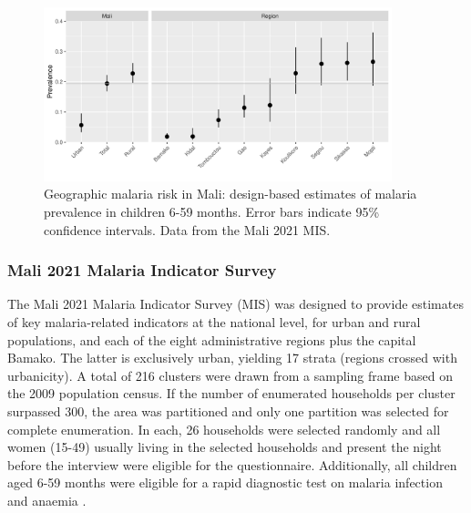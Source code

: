 \begin{figure}[!t]	
	\centering
	\includegraphics[width=0.9\textwidth, keepaspectratio]{figures/mali_designestimates.png}
	\caption{Geographic malaria risk in Mali: design-based estimates of malaria prevalence in children 6-59 months. Error bars indicate 95\% confidence intervals. Data from the Mali 2021 MIS.}
	\label{fig:mli_designestimates}
\end{figure}


\subsubsection*{Mali 2021 Malaria Indicator Survey}\label{sec:mali-2021-malaria-indicator-survey}

The Mali 2021 Malaria Indicator Survey (MIS) was designed to provide estimates of key malaria-related indicators at the national level, for urban and rural populations, and each of the eight administrative regions plus the capital Bamako. The latter is exclusively urban, yielding 17 strata (regions crossed with urbanicity). A total of 216 clusters were drawn from a sampling frame based on the 2009 population census. If the number of enumerated households per cluster surpassed 300, the area was partitioned and only one partition was selected for complete enumeration. In each, 26 households were selected randomly and all women (15-49) usually living in the selected households and present the night before the interview were eligible for the questionnaire. Additionally, all children aged 6-59 months were eligible for a rapid diagnostic test on malaria infection and anaemia \autocite{institutnationaldelastatistiqueinstatEnqueteIndicateursPaludisme2022}. 


